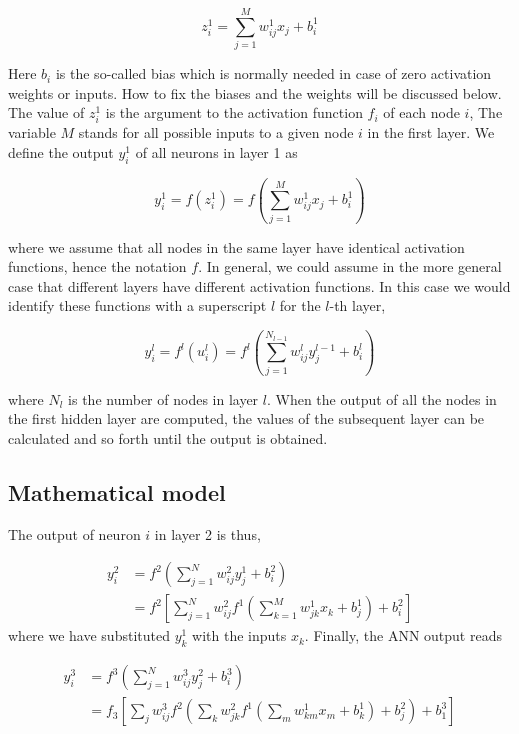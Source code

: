 \documentclass[%
oneside,                 %
final,                   %
10pt]{article}
\begin{document}
\begin{equation} z_i^1 = \sum_{j=1}^{M} w_{ij}^1 x_j + b_i^1
\end{equation}

Here $b_i$ is the so-called bias which is normally needed in
case of zero activation weights or inputs. How to fix the biases and
the weights will be discussed below.  The value of $z_i^1$ is the
argument to the activation function $f_i$ of each node $i$, The
variable $M$ stands for all possible inputs to a given node $i$ in the
first layer.  We define  the output $y_i^1$ of all neurons in layer 1 as

\begin{equation}
 y_i^1 = f(z_i^1) = f\left(\sum_{j=1}^M w_{ij}^1 x_j  + b_i^1\right)
 \label{outputLayer1}
\end{equation}

where we assume that all nodes in the same layer have identical
activation functions, hence the notation $f$. In general, we could assume in the more general case that different layers have different activation functions.
In this case we would identify these functions with a superscript $l$ for the $l$-th layer,

\begin{equation}
 y_i^l = f^l(u_i^l) = f^l\left(\sum_{j=1}^{N_{l-1}} w_{ij}^l y_j^{l-1} + b_i^l\right)
 \label{generalLayer}
\end{equation}

where $N_l$ is the number of nodes in layer $l$. When the output of
all the nodes in the first hidden layer are computed, the values of
the subsequent layer can be calculated and so forth until the output
is obtained.



\subsection{Mathematical model}

The output of neuron $i$ in layer 2 is thus,

\begin{align}
 y_i^2 &= f^2\left(\sum_{j=1}^N w_{ij}^2 y_j^1 + b_i^2\right) \\
 &= f^2\left[\sum_{j=1}^N w_{ij}^2f^1\left(\sum_{k=1}^M w_{jk}^1 x_k + b_j^1\right) + b_i^2\right]
 \label{outputLayer2}
\end{align}
where we have substituted $y_k^1$ with the inputs $x_k$. Finally, the ANN output reads

\begin{align}
 y_i^3 &= f^3\left(\sum_{j=1}^N w_{ij}^3 y_j^2 + b_i^3\right) \\
 &= f_3\left[\sum_{j} w_{ij}^3 f^2\left(\sum_{k} w_{jk}^2 f^1\left(\sum_{m} w_{km}^1 x_m + b_k^1\right) + b_j^2\right)
  + b_1^3\right]
\end{align}
\end{document}
